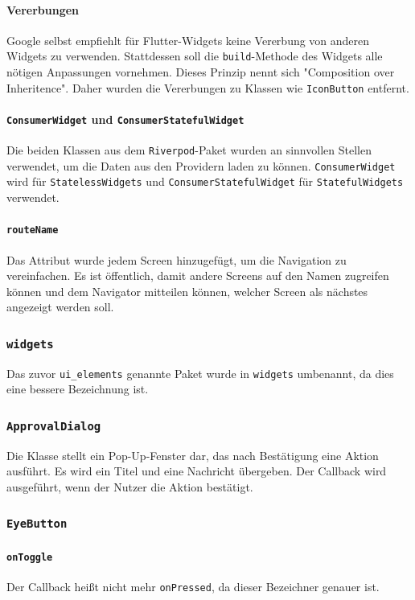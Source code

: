 \documentclass{implementierungsheft}
\begin{document}
\paragraph{Vererbungen}
Google selbst empfiehlt für Flutter-Widgets keine Vererbung von anderen Widgets zu verwenden. Stattdessen soll die \texttt{build}-Methode des Widgets alle nötigen Anpassungen vornehmen. Dieses Prinzip nennt sich "Composition over Inheritence". Daher wurden die Vererbungen zu Klassen wie \texttt{IconButton} entfernt.
\paragraph{\texttt{ConsumerWidget} und \texttt{ConsumerStatefulWidget}} Die beiden Klassen aus dem \texttt{Riverpod}-Paket wurden an sinnvollen Stellen verwendet, um die Daten aus den Providern laden zu können. \texttt{ConsumerWidget} wird für \texttt{StatelessWidgets} und \texttt{ConsumerStatefulWidget} für \texttt{StatefulWid\-gets} verwendet.
\paragraph{\texttt{routeName}}
Das Attribut wurde jedem Screen hinzugefügt, um die Navigation zu vereinfachen. Es ist öffentlich, damit andere Screens auf den Namen zugreifen können und dem Navigator mitteilen können, welcher Screen als nächstes angezeigt werden soll.
\subsubsection{\texttt{widgets}}
Das zuvor \texttt{ui\_elements} genannte Paket wurde in \texttt{widgets} umbenannt, da dies eine bessere Bezeichnung ist.
\subsubsection*{\texttt{ApprovalDialog}}
Die Klasse stellt ein Pop-Up-Fenster dar, das nach Bestätigung eine Aktion ausführt. Es wird ein Titel und eine Nachricht übergeben. Der Callback wird ausgeführt, wenn der Nutzer die Aktion bestätigt.
\subsubsection*{\texttt{EyeButton}}
\paragraph{\texttt{onToggle}}
Der Callback heißt nicht mehr \texttt{onPressed}, da dieser Bezeichner genauer ist.
\end{document}
